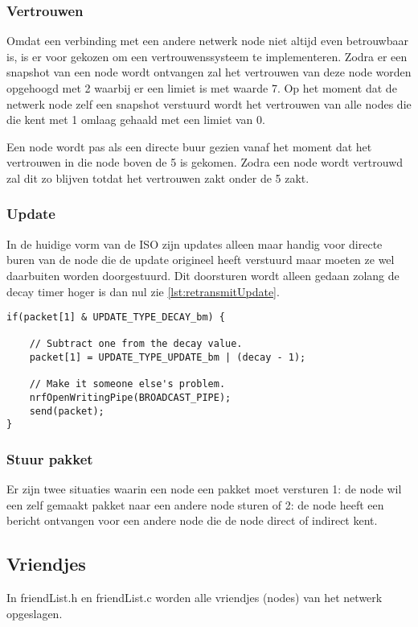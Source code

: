     \subsubsection{Vertrouwen}
        Omdat een verbinding met een andere netwerk node niet altijd even betrouwbaar is, is er voor gekozen om een vertrouwenssysteem te implementeren. Zodra er een snapshot van een node wordt ontvangen zal het vertrouwen van deze node worden opgehoogd met 2 waarbij er een limiet is met waarde 7. Op het moment dat de netwerk node zelf een snapshot verstuurd wordt het vertrouwen van alle nodes die die kent met 1 omlaag gehaald met een limiet van 0. 

        Een node wordt pas als een directe buur gezien vanaf het moment dat het vertrouwen in die node boven de 5 is gekomen. Zodra een node wordt vertrouwd zal dit zo blijven totdat het vertrouwen zakt onder de 5 zakt.
    \subsubsection{Update}
        In de huidige vorm van de ISO zijn updates alleen maar handig voor directe buren van de node die de update origineel heeft verstuurd maar moeten ze wel daarbuiten worden doorgestuurd. Dit doorsturen wordt alleen gedaan zolang de decay timer hoger is dan nul zie \autoref{lst:retransmitUpdate}.
\begin{lstlisting}[caption={Update doorsturen},captionpos=b,label={lst:retransmitUpdate},style=c]
if(packet[1] & UPDATE_TYPE_DECAY_bm) {

    // Subtract one from the decay value.
    packet[1] = UPDATE_TYPE_UPDATE_bm | (decay - 1);

    // Make it someone else's problem.
    nrfOpenWritingPipe(BROADCAST_PIPE);
    send(packet);
}
\end{lstlisting}

    \subsubsection{Stuur pakket}
    Er zijn twee situaties waarin een node een pakket moet versturen 1: de node wil een zelf gemaakt pakket naar een andere node sturen of 2: de node heeft een bericht ontvangen voor een andere node die de node direct of indirect kent.

\subsection{Vriendjes}
    In friendList.h en friendList.c worden alle vriendjes (nodes) van het netwerk opgeslagen. 

